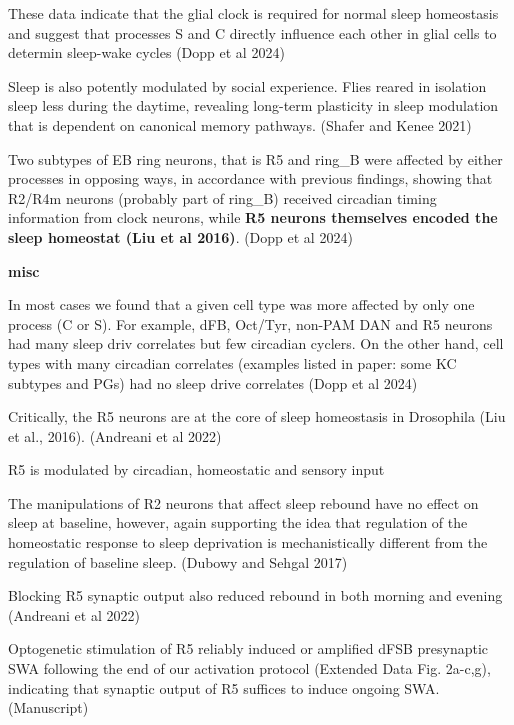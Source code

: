 These data indicate that the glial clock is required for normal sleep homeostasis and
suggest that processes S and C directly influence each other in glial cells to determin
sleep-wake cycles (Dopp et al 2024)

Sleep is also potently modulated by social experience. Flies reared in isolation sleep less during
the daytime, revealing long-term plasticity in sleep modulation that is dependent on canonical memory pathways.
\cite{shaferRegulationDrosophilaSleep2021} (Shafer and Kenee 2021)


Two subtypes of EB ring neurons, that is R5 and ring\_B were affected by either processes in opposing ways, in
    accordance with previous findings, showing that R2/R4m neurons (probably part of ring\_B) received circadian timing
    information from clock neurons, while \textbf{R5 neurons themselves encoded the sleep homeostat (Liu et al 2016)}.
    (Dopp et al 2024)

\noindent\hrulefill


\textbf{misc}

In most cases we found that a given cell type was more affected by only
one process (C or S). For example, dFB, Oct/Tyr, non-PAM DAN and R5 neurons
had many sleep driv correlates but few circadian cyclers. On the
other hand, cell types with many circadian correlates (examples listed
in paper: some KC subtypes and PGs) had no sleep drive correlates
(Dopp et al 2024)

Critically, the R5 neurons are at the core of sleep homeostasis in Drosophila (Liu et al., 2016).
\cite{andreaniCircadianProgrammingEllipsoid2022} (Andreani et al 2022)

R5 is modulated by circadian, homeostatic and sensory input \cite{raccugliaNetworkSpecificSynchronizationElectrical2019}

The manipulations of R2 neurons that affect sleep rebound have no effect on sleep at 
baseline, however, again supporting the idea that regulation of the
homeostatic response to sleep deprivation is mechanistically different from the regulation
of baseline sleep.
\cite{dubowyCircadianRhythmsSleep2017} (Dubowy and Sehgal 2017)

Blocking R5 synaptic output also reduced rebound in both morning and evening
\cite{andreaniCircadianProgrammingEllipsoid2022} (Andreani et al 2022)

Optogenetic stimulation of R5 reliably induced or amplified dFSB presynaptic SWA
following the end of our activation protocol (Extended Data Fig. 2a-c,g), indicating that
synaptic output of R5 suffices to induce ongoing SWA.
\cite{raccugliaCoherentMultilevelNetwork2022} (Manuscript)


